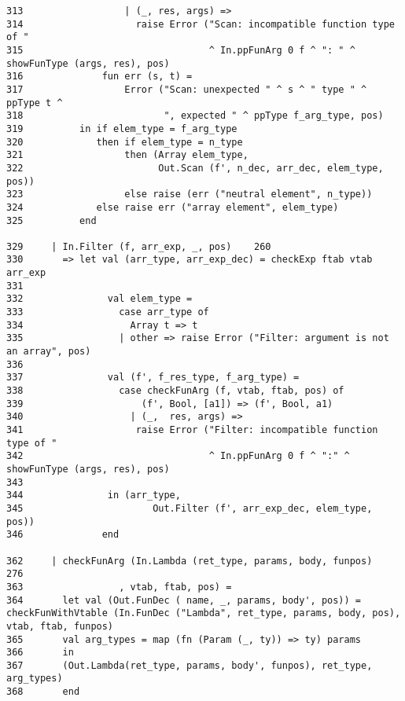 \documentclass[paper=a4, fontsize=11pt]{scrartcl} %
\numberwithin{equation}{section} %
\numberwithin{figure}{section} %
\numberwithin{table}{section} %
\begin{document}
\begin{lstlisting}
313	                 | (_, res, args) => 	 	
314	                   raise Error ("Scan: incompatible function type of " 	 	
315	                                ^ In.ppFunArg 0 f ^ ": " ^ showFunType (args, res), pos) 	 	
316	             fun err (s, t) = 	 	
317	                 Error ("Scan: unexpected " ^ s ^ " type " ^ ppType t ^ 	 	
318	                        ", expected " ^ ppType f_arg_type, pos) 	 	
319	         in if elem_type = f_arg_type 	 	
320	            then if elem_type = n_type 	 	
321	                 then (Array elem_type, 	 	
322	                       Out.Scan (f', n_dec, arr_dec, elem_type, pos)) 	 	
323	                 else raise (err ("neutral element", n_type)) 	 	
324	            else raise err ("array element", elem_type) 	 	
325	         end 	 	

329	    | In.Filter (f, arr_exp, _, pos)	260	 
330	      => let val (arr_type, arr_exp_dec) = checkExp ftab vtab arr_exp 	 	
331	              	 	
332	              val elem_type = 	 	
333	                case arr_type of 	 	
334	                  Array t => t 	 	
335	                | other => raise Error ("Filter: argument is not an array", pos) 	 	
336	 	 	
337	              val (f', f_res_type, f_arg_type) = 	 	
338	                case checkFunArg (f, vtab, ftab, pos) of 	 	
339	                    (f', Bool, [a1]) => (f', Bool, a1) 	 	
340	                  | (_,  res, args) => 	 	
341	                   raise Error ("Filter: incompatible function type of " 	 	
342	                                ^ In.ppFunArg 0 f ^ ":" ^ showFunType (args, res), pos) 	 	
343	                     	 	
344	              in (arr_type, 	 	
345	                      Out.Filter (f', arr_exp_dec, elem_type, pos)) 	 	
346	             end
 	
362	    | checkFunArg (In.Lambda (ret_type, params, body, funpos)	276	 
363	                , vtab, ftab, pos) =  	 	
364	      let val (Out.FunDec ( name, _, params, body', pos)) = checkFunWithVtable (In.FunDec ("Lambda", ret_type, params, body, pos), vtab, ftab, funpos) 	 	
365	      val arg_types = map (fn (Param (_, ty)) => ty) params 	 	
366	      in   	 	
367	      (Out.Lambda(ret_type, params, body', funpos), ret_type, arg_types) 	 	
368	      end 	
\end{lstlisting}

\pagebreak
\end{document}
